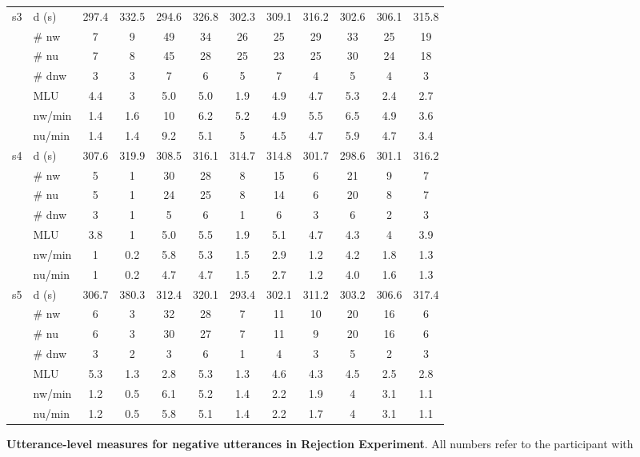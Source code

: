 \begin{screenonly}
\begin{table*}[h]
\begin{tabular*}{\hsize}{@{\extracolsep{\fill}}clcccccccccc}
    \cmidrule{2-12}
    \multirow{7}{*}{s3} & d (s) & 297.4 & 332.5 & 294.6 & 326.8 & 302.3 & 309.1 & 316.2 & 302.6 & 306.1 & 315.8\\
    & \# nw & 7 & 9 & 49 & 34 & 26 & 25 & 29 & 33 & 25 & 19\\
    & \# nu & 7 & 8 & 45 & 28 & 25 & 23 & 25 & 30 & 24 & 18\\
    & \# dnw & 3 & 3 & 7 & 6 & 5 & 7 & 4 & 5 & 4 & 3\\
    & MLU & 4.4 & 3 & 5.0 & 5.0 & 1.9 & 4.9 & 4.7 & 5.3 & 2.4 & 2.7\\
    & nw/min & 1.4 & 1.6 & 10 & 6.2 & 5.2 & 4.9 & 5.5 & 6.5 & 4.9 & 3.6\\
    & nu/min & 1.4 & 1.4 & 9.2 & 5.1 & 5 & 4.5 & 4.7 & 5.9 & 4.7 & 3.4\\
    \cmidrule{2-12}
    \multirow{7}{*}{s4} & d (s) & 307.6 & 319.9 & 308.5 & 316.1 & 314.7 & 314.8 & 301.7 & 298.6 & 301.1 & 316.2\\
    & \# nw & 5 & 1 & 30 & 28 & 8 & 15 & 6 & 21 & 9 & 7\\
    & \# nu & 5 & 1 & 24 & 25 & 8 & 14 & 6 & 20 & 8 & 7\\
    & \# dnw & 3 & 1 & 5 & 6 & 1 & 6 & 3 & 6 & 2 & 3\\
    & MLU & 3.8 & 1 & 5.0 & 5.5 & 1.9 & 5.1 & 4.7 & 4.3 & 4 & 3.9\\
    & nw/min & 1 & 0.2 & 5.8 & 5.3 & 1.5 & 2.9 & 1.2 & 4.2 & 1.8 & 1.3\\
    & nu/min & 1 & 0.2 & 4.7 & 4.7 & 1.5 & 2.7 & 1.2 & 4.0 & 1.6 & 1.3\\
    \cmidrule{2-12}
    \multirow{7}{*}{s5} & d (s) & 306.7 & 380.3 & 312.4 & 320.1 & 293.4 & 302.1 & 311.2 & 303.2 & 306.6 & 317.4\\
    & \# nw & 6 & 3 & 32 & 28 & 7 & 11 & 10 & 20 & 16 & 6\\
    & \# nu & 6 & 3 & 30 & 27 & 7 & 11 & 9 & 20 & 16 & 6\\
    & \# dnw & 3 & 2 & 3 & 6 & 1 & 4 & 3 & 5 & 2 & 3\\
    & MLU & 5.3 & 1.3 & 2.8 & 5.3 & 1.3 & 4.6 & 4.3 & 4.5 & 2.5 & 2.8\\
    & nw/min & 1.2 & 0.5 & 6.1 & 5.2 & 1.4 & 2.2 & 1.9 & 4 & 3.1 & 1.1\\
    & nu/min & 1.2 & 0.5 & 5.8 & 5.1 & 1.4 & 2.2 & 1.7 & 4 & 3.1 & 1.1\\
    \bottomrule
  \end{tabular*}
\end{table*}
\begin{table*}[h]
\caption{\textbf{Utterance-level measures for negative utterances in Rejection Experiment}. All numbers refer to the participant with
}
\end{table*}
\end{screenonly}
